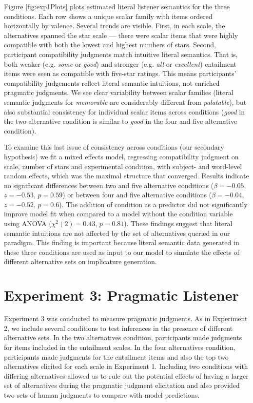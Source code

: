 \documentclass[10pt, letterpaper]{article}
\begin{document}
Figure \ref{fig:exp1Plots} plots estimated literal listener semantics
for the three conditions. Each row shows a unique scalar family with
items ordered horizontally by valence. Several trends are visible.
First, in each scale, the alternatives spanned the star scale --- there
were scalar items that were highly compatible with both the lowest and
highest numbers of stars. Second, participant compatibility judgments
match intuitive literal semantics. That is, both weaker (e.g.
\emph{some} or \emph{good}) and stronger (e.g. \emph{all} or
\emph{excellent}) entailment items were seen as compatible with
five-star ratings. This means participants' compatibility judgements
reflect literal semantic intuitions, not enriched pragmatic judgments.
We see clear variability between scalar families (literal semantic
judgments for \emph{memorable} are considerably different from
\emph{palatable}), but also substantial consistency for individual
scalar items across conditions (\emph{good} in the two alternative
condition is similar to \emph{good} in the four and five alternative
condition).

To examine this last issue of consistency across conditions (our
secondary hypothesis) we fit a mixed effects model, regressing
compatibility judgment on scale, number of stars and experimental
condition, with subject- and word-level random effects, which was the
maximal structure that converged. Results indicate no significant
differences between two and five alternative conditions
(\(\beta=-0.05\), \(z = -0.53\), \(p = 0.59\)) or between four and five
alternative conditions (\(\beta = -0.04\), \(z = -0.52\), \(p = 0.6\)).
The addition of condition as a predictor did not significantly improve
model fit when compared to a model without the condition variable using
ANOVA (\(\chi^2(2) = 0.43\), \(p = 0.81\)). These findings suggest that
literal semantic intuitions are not affected by the set of alternatives
queried in our paradigm. This finding is important because literal
semantic data generated in these three conditions are used as input to
our model to simulate the effects of different alternative sets on
implicature generation.

\section{Experiment 3: Pragmatic
Listener}\label{experiment-3-pragmatic-listener}

Experiment 3 was conducted to measure pragmatic judgments. As in
Experiment 2, we include several conditions to test inferences in the
presence of different alternative sets. In the two alternatives
condition, participants made judgments for items included in the
entailment scales. In the four alternatives condition, participants made
judgments for the entailment items and also the top two alternatives
elicited for each scale in Experiment 1. Including two conditions with
differing alternatives allowed us to rule out the potential effects of
having a larger set of alternatives during the pragmatic judgment
elicitation and also provided two sets of human judgments to compare
with model predictions.
\end{document}
